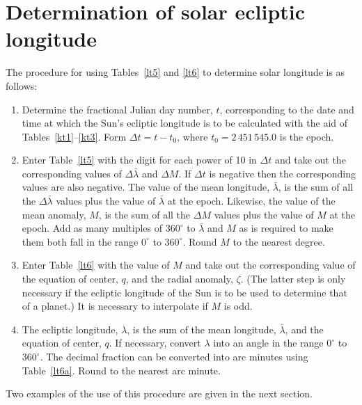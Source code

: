 \section{Determination of solar ecliptic longitude}\label{ssun}
The procedure for using Tables~\ref{lt5} and \ref{lt6} to determine solar longitude  is as follows:
\begin{enumerate}

\item Determine the fractional Julian day number, $t$, corresponding to the date and time
at which the Sun's ecliptic longitude is to be calculated with the aid of Tables~\ref{kt1}--\ref{kt3}. Form $\Delta t = t-t_0$, where $t_0=2\,451\,545.0$ is the epoch. 

\item Enter Table~\ref{lt5} with the digit for each power of 10
in ${\Delta} t$ and take out the corresponding values of $\Delta\bar{\lambda}$ and $\Delta M$. If $\Delta t$ is negative then the corresponding
values are also negative.
The value of the mean longitude, $\bar{\lambda}$, is the
sum of all the $\Delta\bar{\lambda}$ values plus the value of $\bar{\lambda}$ at the epoch. Likewise, the value of the mean anomaly, $M$, is
the sum of all the $\Delta M$ values plus the value of $M$ at the epoch. 
Add as many multiples of $360^\circ$ to $\bar{\lambda}$ and $M$
as is required to make them both fall in the range $0^\circ$ to $360^\circ$. Round $M$ to the nearest degree. 

\item Enter Table~\ref{lt6} with the value of $M$ and take out the
corresponding value of the equation of center, $q$, and the radial anomaly, $\zeta$. (The latter step is only necessary if the ecliptic longitude of the Sun is
to be used to determine that of a planet.) It is necessary to interpolate if $M$ is odd.

\item The ecliptic longitude, $\lambda$, is the sum of the mean longitude, $\bar{\lambda}$, and the equation of center, $q$. If necessary, convert $\lambda$ into an angle in the range $0^\circ$ to $360^\circ$. 
The decimal fraction can be converted into arc minutes
using Table~\ref{lt6a}. Round to the nearest arc minute. 
\end{enumerate}
Two examples of the use of this procedure are given in the next section.

